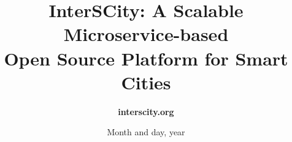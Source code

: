 
\title[The InterSCity Platform]{InterSCity: A Scalable Microservice-based\\Open Source Platform for Smart Cities}


\author[interscity@ime.usp.br]{\textbf{interscity.org}}

\date{Month and day, year}





